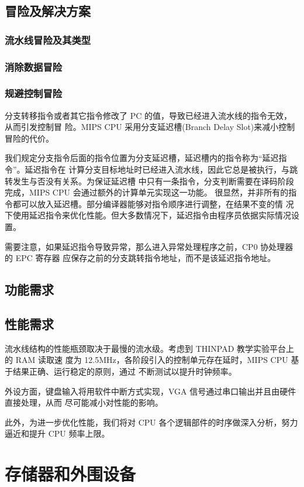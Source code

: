 \documentclass[11pt,utf8]{article}
\begin{document}
\subsection{冒险及解决方案}
\subsubsection{流水线冒险及其类型}
\subsubsection{消除数据冒险}
\subsubsection{规避控制冒险}
分支转移指令或者其它指令修改了 PC 的值，导致已经进入流水线的指令无效，从而引发控制冒 险。MIPS CPU 采用分支延迟槽(Branch Delay Slot)来减小控制冒险的代价。

我们规定分支指令后面的指令位置为分支延迟槽，延迟槽内的指令称为“延迟指令”。延迟指令在 计算分支目标地址时已经进入流水线，因此它总是被执行，与跳转发生与否没有关系。为保证延迟槽 中只有一条指令，分支判断需要在译码阶段完成，MIPS CPU 会通过额外的计算单元实现这一功能。 很显然，并非所有的指令都可以放入延迟槽。部分编译器能够对指令顺序进行调整，在结果不变的情 况下使用延迟指令来优化性能。但大多数情况下，延迟指令由程序员依据实际情况设置。

需要注意，如果延迟指令导致异常，那么进入异常处理程序之前，CP0 协处理器的 EPC 寄存器 应保存之前的分支跳转指令地址，而不是该延迟指令地址。
\subsection{功能需求}
\subsection{性能需求}
流水线结构的性能瓶颈取决于最慢的流水级。考虑到 THINPAD 教学实验平台上的 RAM 读取速 度为 12.5MHz，各阶段引入的控制单元存在延时，MIPS CPU 基于结果正确、运行稳定的原则，通过 不断测试以提升时钟频率。

外设方面，键盘输入将用软件中断方式实现，VGA 信号通过串口输出并且由硬件直接处理，从而 尽可能减小对性能的影响。

此外，为进一步优化性能，我们将对 CPU 各个逻辑部件的时序做深入分析，努力逼近和提升 CPU 频率上限。

\section{存储器和外围设备}
\end{document}
